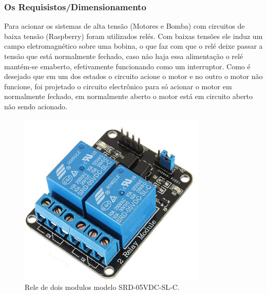 \subsubsection{Os Requisistos/Dimensionamento}
Para acionar os sistemas de alta tensão (Motores e Bomba) com circuitos de baixa tensão (Raspberry) foram utilizados relés. Com baixas tensões ele induz um campo eletromagnético sobre uma bobina, o que faz com que o relé deixe passar a tensão que está normalmente fechado, caso não haja essa alimentação o relé mantém-se emaberto, efetivamente funcionando como um interruptor.  Como é desejado que em um dos estados o circuito acione o motor e no outro o motor não funcione, foi projetado o circuito electrônico para só acionar o motor em normalmente fechado, em normalmente aberto o motor está em circuito aberto não sendo acionado.
\par
\begin{figure}[h]
  \centering
  \includegraphics[width=0.8\textwidth]{figures/rele.png}
  \caption{Rele de dois modulos modelo SRD-05VDC-SL-C.}
  \label{fig:rele}
\end{figure}
\FloatBarrier
\par

